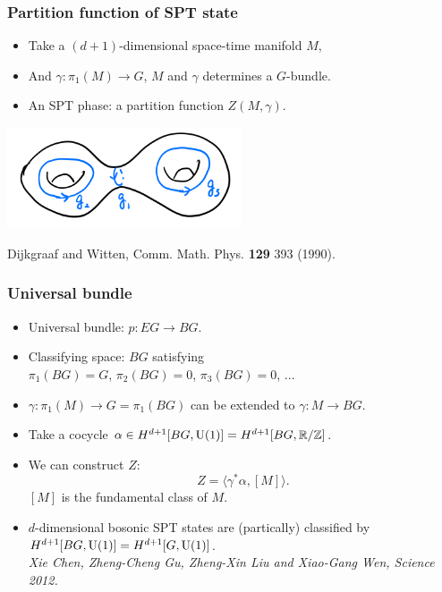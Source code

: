 \documentclass[xcolor=table, aspectratio=43,ignorenonframetext]{beamer}
\newcommand{\uone}{\text U(1)}
\begin{document}
\begin{frame}
	\frametitle{Partition function of SPT state}
	\begin{itemize}
		\item Take a $(d+1)$-dimensional space-time manifold $M$,
		\item And $\gamma:\pi_1(M)\rightarrow G$, $M$ and $\gamma$ determines a $G$-bundle.
		\item An SPT phase: a partition function $Z(M,\gamma)$.
	\end{itemize}
	\begin{center}
		\includegraphics[height=3cm]{../spt-lecture/manifold}
	\end{center}
	{\small Dijkgraaf and Witten, Comm. Math. Phys. \textbf{129} 393 (1990).}
\end{frame}

\begin{frame}
	\frametitle{Universal bundle}
	\begin{itemize}
		\item Universal bundle: $p: EG \rightarrow BG$.
		\item Classifying space: $BG$ satisfying\\
		$\pi_1(BG) = G$, $\pi_2(BG)=0$, $\pi_3(BG)=0$, ...
		\item $\gamma:\pi_1(M)\rightarrow G=\pi_1(BG)$ can be extended to $\gamma:M\rightarrow BG$.
		\item Take a cocycle $\alpha\in H^{d+1}[BG, \uone]=H^{d+1}[BG, \mathbb R/\mathbb Z]$.
		\item We can construct $Z$:
		\[Z = \langle\gamma^\ast\alpha, [M]\rangle.\]
		$[M]$ is the fundamental class of $M$.
		\item $d$-dimensional bosonic SPT states are (partically) classified by $H^{d+1}[BG, \uone]=H^{d+1}[G, \uone]$.\\
		\emph{\small Xie Chen, Zheng-Cheng Gu, Zheng-Xin Liu and Xiao-Gang Wen, Science 2012.}
	\end{itemize}
\end{frame}
\end{document}
